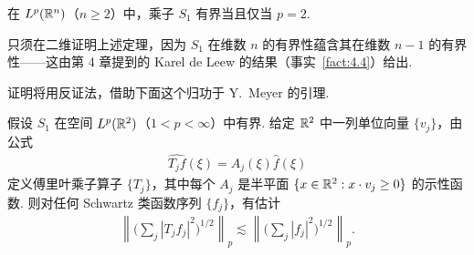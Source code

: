 \begin{theorem}\label{thm:5.1}
在 $L^p(\mathbb{R}^n)$（$n \geq 2$）中，乘子 $S_1$ 有界当且仅当 $p = 2$.
\end{theorem}

\begin{remark}\label{rem:5.2}
只须在二维证明上述定理，因为 $S_1$ 在维数 $n$ 的有界性蕴含其在维数 $n-1$ 的有界性——这由第 4 章提到的 Karel de Leew 的结果（事实~\ref{fact:4.4}）给出.
\end{remark}

证明将用反证法，借助下面这个归功于 Y.~Meyer 的引理.

\begin{lemma}\label{lem:5.3}
假设 $S_1$ 在空间 $L^p(\mathbb{R}^2)$（$1 < p < \infty$）中有界. 给定 $\mathbb{R}^2$ 中一列单位向量 $\{v_j\}$，由公式
\begin{align*}
  \widehat{T_{j}f}(\xi)=A_{j}(\xi)\widehat{f}(\xi)
\end{align*}
定义傅里叶乘子算子 $\{T_j\}$，其中每个 $A_j$ 是半平面 $\{x \in \mathbb{R}^2 : x \cdot v_j \geq 0\}$ 的示性函数. 则对任何 Schwartz 类函数序列 $\{f_j\}$，有估计
\begin{align*}
  \left\|\Big(\sum_{j}|T_{j}f_{j}|^{2}\Big)^{1/2}\right\|_{p}\lesssim\left\|\Big(\sum_{j}|f_{j}|^{2}\Big)^{1/2}\right\|_{p}.
\end{align*}
\end{lemma}

